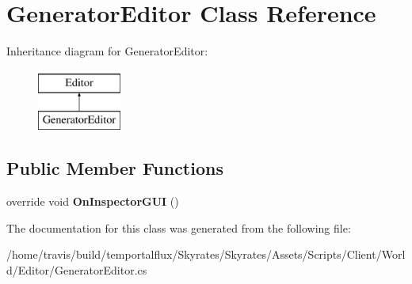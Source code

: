\hypertarget{class_generator_editor}{\section{Generator\-Editor Class Reference}
\label{class_generator_editor}
}
Inheritance diagram for Generator\-Editor\-:\begin{figure}[H]
\begin{center}
\leavevmode
\includegraphics[height=2.000000cm]{class_generator_editor}
\end{center}
\end{figure}
\subsection*{Public Member Functions}
\begin{DoxyCompactItemize}
\item 
\hypertarget{class_generator_editor_ae63afdf15cc675f63b723c13925e7a0d}{override void {\bfseries On\-Inspector\-G\-U\-I} ()}\label{class_generator_editor_ae63afdf15cc675f63b723c13925e7a0d}

\end{DoxyCompactItemize}


The documentation for this class was generated from the following file\-:\begin{DoxyCompactItemize}
\item 
/home/travis/build/temportalflux/\-Skyrates/\-Skyrates/\-Assets/\-Scripts/\-Client/\-World/\-Editor/Generator\-Editor.\-cs\end{DoxyCompactItemize}
